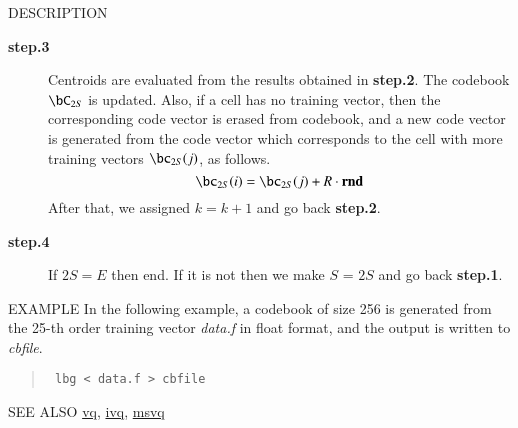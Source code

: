 \begin{qsection}{DESCRIPTION}
\begin{description}
\item[\bf step.3~~~]
Centroids are evaluated from the results obtained in {\bf step.2}.
The codebook $\bC_{2S}$ is updated.
Also, if a cell has no training vector, then the corresponding
code vector is erased from codebook,
and a new code vector is generated from the code vector
which corresponds to the cell with more training vectors 
$\bc_{2S}(j)$, as follows.
\begin{displaymath}
\bc_{2S}(i)=\bc_{2S}(j) + R \cdot \bm{\mathrm{rnd}}
\end{displaymath}
After that, we assigned $k=k+1$ and go back {\bf step.2}.

\item[\bf step.4~~~]
If $2S = E$ then end.
If it is not then we make $S$ = $2S$ and go back {\bf step.1}.

\end{description}
\end{qsection}

\begin{options}
\end{options}

\begin{qsection}{EXAMPLE}
In the following example, a codebook of size 256 is generated from
the 25-th order training vector {\em data.f} in float format,
and the output is written to {\em cbfile}.
\begin{quote}
\verb! lbg < data.f > cbfile!
\end{quote}
\end{qsection}

\begin{qsection}{SEE ALSO}
\hyperlink{vq}{vq},
\hyperlink{ivq}{ivq},
\hyperlink{msvq}{msvq}
\end{qsection}
